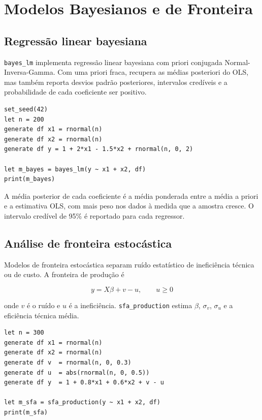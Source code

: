 \chapter{Modelos Bayesianos e de Fronteira}

\section{Regressão linear bayesiana}

\texttt{bayes\_lm} implementa regressão linear bayesiana com priori conjugada
Normal-Inversa-Gamma. Com uma priori fraca, recupera as médias
posteriori do OLS, mas também reporta desvios padrão posteriores,
intervalos credíveis e a probabilidade de cada coeficiente ser positivo.

\begin{lstlisting}[caption={Regressão linear bayesiana}]
set_seed(42)
let n = 200
generate df x1 = rnormal(n)
generate df x2 = rnormal(n)
generate df y = 1 + 2*x1 - 1.5*x2 + rnormal(n, 0, 2)

let m_bayes = bayes_lm(y ~ x1 + x2, df)
print(m_bayes)
\end{lstlisting}

A média posterior de cada coeficiente é a média ponderada entre a média
a priori e a estimativa OLS, com mais peso nos dados à medida que a
amostra cresce. O intervalo credível de 95\% é reportado para cada
regressor.

\section{Análise de fronteira estocástica}

Modelos de fronteira estocástica separam ruído estatístico de
ineficiência técnica ou de custo. A fronteira de produção é

\[
y = X\beta + v - u, \qquad u \ge 0
\]

onde $v$ é o ruído e $u$ é a ineficiência. \texttt{sfa\_production} estima
$\beta$, $\sigma_v$, $\sigma_u$ e a eficiência técnica média.

\begin{lstlisting}[caption={Fronteira de produção estocástica}]
let n = 300
generate df x1 = rnormal(n)
generate df x2 = rnormal(n)
generate df v  = rnormal(n, 0, 0.3)
generate df u  = abs(rnormal(n, 0, 0.5))
generate df y  = 1 + 0.8*x1 + 0.6*x2 + v - u

let m_sfa = sfa_production(y ~ x1 + x2, df)
print(m_sfa)
\end{lstlisting}

